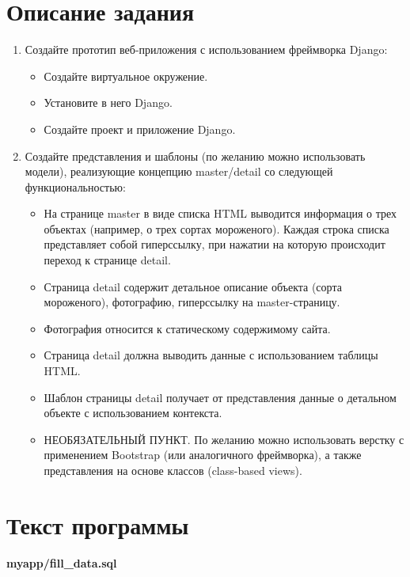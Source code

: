 \documentclass[20pt,a4paper]{report}
\begin{document}
	\chapter{Описание задания}
	\large
	\begin{enumerate}
		\item Создайте прототип веб-приложения с использованием фреймворка Django: \\
		\begin{itemize}
			\item Создайте виртуальное окружение.
			\item Установите в него Django.
			\item Создайте проект и приложение Django.
		\end{itemize}
		\item Создайте представления и шаблоны (по желанию можно использовать модели), реализующие концепцию master/detail со следующей функциональностью: \\
		\begin{itemize}
			\item На странице master в виде списка HTML выводится информация о трех объектах (например, о трех сортах мороженого). Каждая строка списка представляет собой гиперссылку, при нажатии на которую происходит переход к странице detail.
			\item Страница detail содержит детальное описание объекта (сорта мороженого), фотографию, гиперссылку на master-страницу.
			\item Фотография относится к статическому содержимому сайта.
			\item Страница detail должна выводить данные с использованием таблицы HTML.
			\item Шаблон страницы detail получает от представления данные о детальном объекте с использованием контекста.
			\item НЕОБЯЗАТЕЛЬНЫЙ ПУНКТ. По желанию можно использовать верстку с применением Bootstrap (или аналогичного фреймворка), а также представления на основе классов (class-based views).
		\end{itemize}
	\end{enumerate}
	
	\chapter{Текст программы}
		\qquad \textbf{myapp/fill\_data.sql} \\
		\small
		\inputminted[tabsize=4, linenos, breaklines]{sql}{myapp/fill_data.sql}
		\large
		
\end{document}
